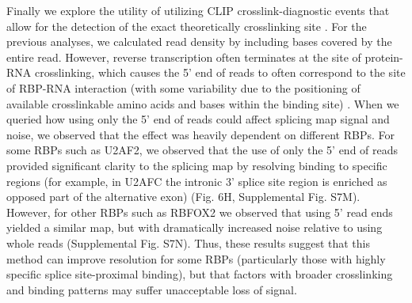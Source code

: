 Finally we explore the utility of utilizing CLIP crosslink-diagnostic events that allow for the detection of the exact theoretically crosslinking site \cite{Rossbach2014, Konig2010}. For the previous analyses, we calculated read density by including bases covered by the entire read. However, reverse transcription often terminates at the site of protein-RNA crosslinking, which causes the 5’ end of reads to often correspond to the site of RBP-RNA interaction (with some variability due to the positioning of available crosslinkable amino acids and bases within the binding site) \cite{Konig2010}. When we queried how using only the 5’ end of reads could affect splicing map signal and noise, we observed that the effect was heavily dependent on different RBPs. For some RBPs such as U2AF2, we observed that the use of only the 5’ end of reads provided significant clarity to the splicing map by resolving binding to specific regions (for example, in U2AFC the intronic 3’ splice site region is enriched as opposed part of the alternative exon) (Fig. 6H, Supplemental Fig. S7M). However, for other RBPs such as RBFOX2 we observed that using 5’ read ends yielded a similar map, but with dramatically increased noise relative to using whole reads (Supplemental Fig. S7N). Thus, these results suggest that this method can improve resolution for some RBPs (particularly those with highly specific splice site-proximal binding), but that factors with broader crosslinking and binding patterns may suffer unacceptable loss of signal.

